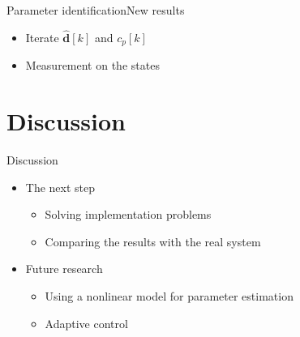 \begin{frame}{Parameter identification}{New results}

\begin{itemize}
	 	\item<1-> Iterate $\hat{\pmb{d}}[k]$ and $c_p [k]$
	 	\item<1-> Measurement on the states 
	 	\end{itemize}

\begin{figure}[H]
   \centering
    
\end{figure}

\begin{figure}[H]
   \centering
    
\end{figure}

\end{frame}


\section{Discussion}
\begin{frame}{Discussion}{}

\begin{itemize}
	\item<1->The next step
	\begin{itemize}
	 \item<1-> Solving implementation problems  
	 \item<1-> Comparing the results with the real system
	\end{itemize}
\end{itemize}

\begin{itemize}
\item<2-> Future research
	 \begin{itemize}
	 \item<2-> Using a nonlinear model for parameter estimation 
	 \item<2-> Adaptive control
	 \end{itemize}
\end{itemize}

\end{frame}
